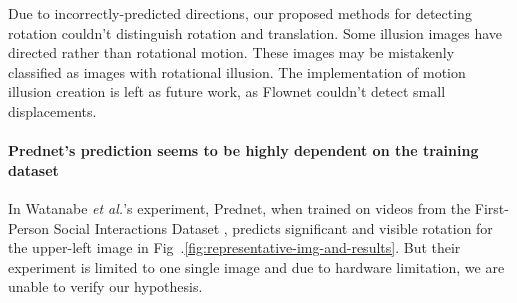 \documentclass[journal]{IEEEtran}
\begin{document}
  Due to incorrectly-predicted directions, our proposed methods for detecting rotation couldn't distinguish rotation and translation. Some illusion images have directed rather than rotational motion. These images may be mistakenly classified as images with rotational illusion. The implementation of motion illusion creation is left as future work, as Flownet couldn't detect small displacements.

  \paragraph{Prednet's prediction seems to be highly dependent on the training dataset} In Watanabe \textit{et al.}'s experiment, Prednet, when trained on videos from the First-Person Social Interactions Dataset \cite{fathi2012social}, predicts significant and visible rotation for the upper-left image in Fig~.\ref{fig:representative-img-and-results}. But their experiment is limited to one single image and due to hardware limitation, we are unable to verify our hypothesis.
  
\end{document}
